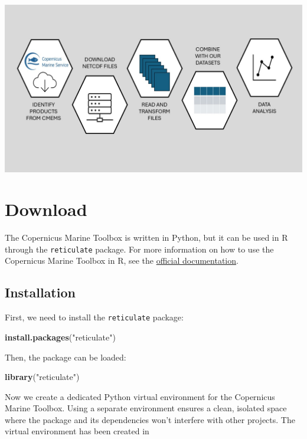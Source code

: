 \documentclass[
]{book}
\newenvironment{Shaded}{\begin{snugshade}}{\end{snugshade}}
\newcommand{\FunctionTok}[1]{\textcolor[rgb]{0.13,0.29,0.53}{\textbf{#1}}}
\newcommand{\NormalTok}[1]{#1}
\newcommand{\StringTok}[1]{\textcolor[rgb]{0.31,0.60,0.02}{#1}}
\begin{document}
\includegraphics[width=17.78in]{images/diagram_CMEMSdata}

\chapter{Download}\label{download}

The Copernicus Marine Toolbox is written in Python, but it can be used in R through the \texttt{reticulate} package. For more information on how to use the Copernicus Marine Toolbox in R, see the \href{https://help.marine.copernicus.eu/en/articles/8638253-how-to-download-data-via-the-copernicus-marine-toolbox-in-r}{official documentation}.

\section{Installation}\label{installation}

First, we need to install the \texttt{reticulate} package:

\begin{Shaded}
\begin{Highlighting}[]
\FunctionTok{install.packages}\NormalTok{(}\StringTok{"reticulate"}\NormalTok{)}
\end{Highlighting}
\end{Shaded}

Then, the package can be loaded:

\begin{Shaded}
\begin{Highlighting}[]
\FunctionTok{library}\NormalTok{(}\StringTok{"reticulate"}\NormalTok{)}
\end{Highlighting}
\end{Shaded}

Now we create a dedicated Python virtual environment for the Copernicus Marine Toolbox. Using a separate environment ensures a clean, isolated space where the package and its dependencies won't interfere with other projects. The virtual environment has been created in
\end{document}
